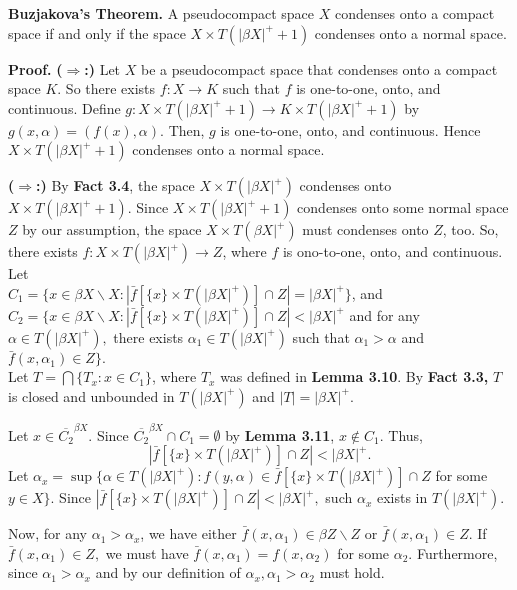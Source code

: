 \documentclass{article}
\begin{document}
\textbf{Buzjakova's Theorem.} A pseudocompact space $X$ condenses onto a compact space if and only if the space $X\times T(\left| \beta X \right| ^+ +1)$ condenses onto a normal space. 
\vskip 25pt

\textbf{Proof.}\vskip 10pt
\textbf{($\Rightarrow$:) } Let $X$ be a pseudocompact space that condenses onto a compact space $K$. So there exists $f:X\rightarrow K$ such that $f$ is one-to-one, onto, and continuous. Define $g: X\times T(|\beta X|^+ +1) \rightarrow K\times T(|\beta X|^+ +1)$ by $g(x,\alpha)=(f(x), \alpha).$ Then, $g$ is one-to-one, onto, and continuous. Hence $X\times T(|\beta X|^+ +1)$ condenses onto a normal space. 


\vskip 20pt


\textbf{($\Rightarrow$:)} By \textbf{Fact 3.4}, the space $X\times T(|\beta X|^+)$ condenses onto $X\times T(|\beta X|^+ +1).$ 
Since $X\times T(|\beta X|^+ +1)$ condenses onto some normal space $Z$ by our assumption, the space $X\times T(\beta X|^+)$ must condenses onto $Z$, too. 
So, there exists $f: X\times T(|\beta X|^+) \rightarrow Z$, where $f$ is ono-to-one, onto, and continuous. 
Let \\
$C_1=\{x\in  \beta X \backslash X: |\bar{f}[\{x\} \times T(|\beta X|^+)] \cap Z|=|\beta X|^+\}$, and \\
$C_2=\{x\in \beta X\backslash X: \left|\bar{f}[\{x\}\times T(|\beta X|^+)]\cap Z\right|<|\beta X|^+ $ and for any $\alpha\in T(|\beta X|^+),$ there exists $\alpha_1\in T(|\beta X|^+)$ such that $\alpha_1 >\alpha$ and $\bar{f}(x,\alpha_1) \in Z \}.$\\

Let $T=\bigcap\{T_x:x\in C_1\}$, where $T_x$ was defined in \textbf{Lemma 3.10}. By \textbf{Fact 3.3,} $T$ is closed and unbounded in $T(|\beta X|^+)$ and $|T|=|\beta X|^+.$

\vskip 15pt

Let $x\in \overline{C_2}^{\beta X}.$ Since $\overline{C_2}^{\beta X}\cap C_1=\emptyset$ by \textbf{Lemma 3.11}, $x\notin C_1$. Thus, $$\left|\bar{f}\left[ \{x\}\times T(|\beta X|^+) \right] \cap Z \right| < |\beta X|^+.$$ 
Let $\alpha_x=\sup\{ \alpha \in T(|\beta X|^+): f(y,\alpha)\in \bar{f}\left[ \{x\}\times T(|\beta X|^+) \right] \cap Z$ for some $y\in X\}$. Since   $\left|\bar{f}\left[ \{x\}\times T(|\beta X|^+) \right] \cap Z \right| < |\beta X|^+,$ such $\alpha_x$ exists in $T(|\beta X|^+)$. 

\vskip 10pt

Now, for any $\alpha_1 > \alpha_x$, we have either $\bar{f}(x,\alpha_1)\in \beta Z \backslash Z$ or $\bar{f}(x,\alpha_1)\in Z$. If $\bar{f}(x,\alpha_1)\in Z,$ we must have $\bar{f}(x,\alpha_1)=f(x,\alpha_2)$ for some $\alpha_2.$ Furthermore, since $\alpha_1>\alpha_x$ and by our definition of $\alpha_x, \alpha_1>\alpha_2$ must hold.
\vskip 15pt
\end{document}
